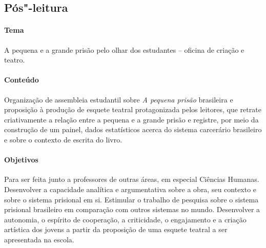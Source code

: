 \documentclass[11pt]{extarticle}
\begin{document}
\subsection{Pós"-leitura}

\paragraph{Tema} A pequena e a grande prisão pelo olhar dos estudantes
-- oficina de criação e teatro.

\paragraph{Conteúdo} Organização de assembleia estudantil sobre \emph{A
pequena prisão} brasileira e proposição à produção de esquete teatral
protagonizada pelos leitores, que retrate criativamente a relação entre
a pequena e a grande prisão e registre, por meio da construção de um
painel, dados estatísticos acerca do sistema carcerário brasileiro e
sobre o contexto de escrita do livro.

\paragraph{Objetivos} Para ser feita junto a professores de outras áreas, em especial Ciências Humanas. Desenvolver a capacidade analítica e argumentativa
sobre a obra, seu contexto e sobre o sistema prisional em si. Estimular
o trabalho de pesquisa sobre o sistema prisional brasileiro em
comparação com outros sistemas no mundo. Desenvolver a autonomia, o
espírito de cooperação, a criticidade, o engajamento e a criação
artística dos jovens a partir da proposição de uma esquete teatral a ser
apresentada na escola.
\end{document}

